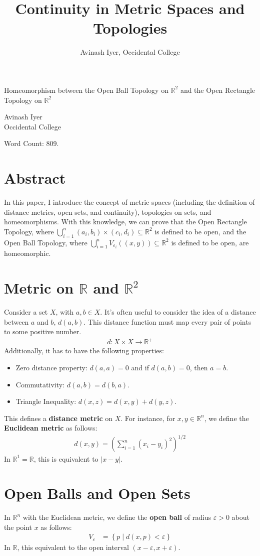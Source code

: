 \documentclass[12pt]{extarticle}
\title{Continuity in Metric Spaces and Topologies}
\author{Avinash Iyer, Occidental College}
\date{}
\newcommand{\R}{\mathbb{R}}
\begin{document}
\doublespacing
  \begin{center}
    \large \sc Homeomorphism between the Open Ball Topology on $\R^2$ and the Open Rectangle Topology on $\R^2$
  \end{center}
  \begin{center}
    Avinash Iyer\\
    Occidental College
  \end{center}
  Word Count: 809.
  \section*{Abstract}%
  In this paper, I introduce the concept of metric spaces (including the definition of distance metrics, open sets, and continuity), topologies on sets, and homeomorphisms. With this knowledge, we can prove that the Open Rectangle Topology, where $\bigcup_{i=1}^{n}(a_i,b_i)\times (c_i,d_i) \subseteq \R^2$ is defined to be open, and the Open Ball Topology, where $\bigcup_{i=1}^{n} V_{\varepsilon_i}((x,y))\subseteq \R^2$ is defined to be open, are homeomorphic.
  \section*{Metric on $\R$ and $\R^2$}%
  Consider a set $X$, with $a,b\in X$. It's often useful to consider the idea of a distance between $a$ and $b$, $d(a,b)$. This distance function must map every pair of points to some positive number.
  \begin{align*}
    d: X\times X \rightarrow \R^+
  \end{align*}
  Additionally, it has to have the following properties:
  \begin{itemize}
    \item Zero distance property: $d(a,a) = 0$ and if $d(a,b) = 0$, then $a = b$.
    \item Commutativity: $d(a,b) = d(b,a)$.
    \item Triangle Inequality: $d(x,z) = d(x,y) + d(y,z)$.
  \end{itemize}
  This defines a \textbf{distance metric} on $X$. For instance, for $x,y\in\R^n$, we define the \textbf{Euclidean metric} as follows:
  \begin{align*}
    d(x,y) = \left(\sum_{i=1}^{n}(x_i-y_i)^2\right)^{1/2}
  \end{align*}
  In $\R^1 = \R$, this is equivalent to $|x-y|$.
  \section*{Open Balls and Open Sets}%
  In $\R^n$ with the Euclidean metric, we define the \textbf{open ball} of radius $\varepsilon > 0$ about the point $x$ as follows:
  \begin{align*}
    V_{\varepsilon} &= \left\{p \mid d(x,p) < \varepsilon\right\}
  \end{align*}
  In $\R$, this equivalent to the open interval $(x-\varepsilon,x+\varepsilon)$.\\
\end{document}
